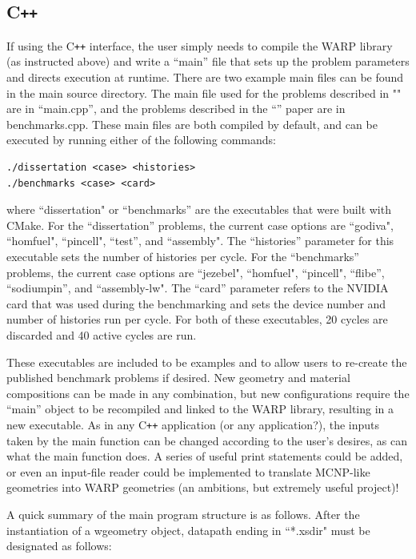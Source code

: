 \documentclass[twoside,a4paper]{refart}
\begin{document}
\subsection{C\texttt{++}}

If using the C\texttt{++} interface, the user simply needs to compile the WARP library (as instructed above) and 
write a ``main'' file that sets up the problem parameters and directs execution at runtime.  There are two example main files can be found in the main source directory. The main file used for the problems described in "" are in ``main.cpp'', and the problems described in the ``'' paper are in benchmarks.cpp.  These main files are both compiled by default, and can be executed by running either of the following commands:

\begin{verbatim}
./dissertation <case> <histories>
./benchmarks <case> <card>
\end{verbatim}

where ``dissertation" or ``benchmarks'' are the executables that were built with CMake.  For the ``dissertation'' problems, the current case options are ``godiva",
``homfuel", ``pincell", ``test'', and ``assembly".  The ``histories'' parameter for this executable sets the number of histories per cycle. For the ``benchmarks'' problems, the current case options are ``jezebel", ``homfuel", ``pincell", ``flibe'', ``sodiumpin'', and ``assembly-lw".   The ``card'' parameter refers to the NVIDIA card that was used during the benchmarking and sets the device number and number of histories run per cycle.  For both of these executables, 20 cycles are discarded and 40 active cycles are run.

These executables are included to be examples and to allow users to re-create the published benchmark problems if desired.  New geometry and material compositions can be made in any combination, but new configurations require the ``main'' object to be recompiled and linked to the WARP library, resulting in a new executable.  As in any C\texttt{++}  application (or any application?), the inputs taken by the main function can be changed according to the user's desires, as can what the main function does.  A series of useful print statements could be added, or even an input-file reader could be implemented to translate MCNP-like geometries into WARP geometries (an ambitions, but extremely useful project)!

A quick summary of the main program structure is as follows.  After the instantiation of a wgeometry object, datapath ending in ``*.xsdir" must be designated as follows:
\end{document}
